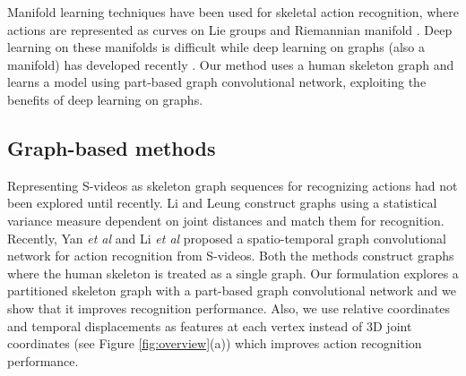 \documentclass{bmvc2k}
\def\etal{\emph{et al}\bmvaOneDot}
\begin{document}
Manifold learning techniques have been used for skeletal action recognition, where actions are represented as curves on Lie groups \cite{vemulapalli2014human} and Riemannian manifold \cite{devanne20153}. Deep learning on these manifolds is difficult \cite{huang2017deep} while deep learning on graphs (also a manifold) has developed recently \cite{defferrard2016convolutional, kipf2016semi}. Our method uses a human skeleton graph and learns a model using part-based graph convolutional network, exploiting the benefits of deep learning on graphs.

\subsection{Graph-based methods}
\label{sec:2_2}
Representing S-videos as skeleton graph sequences for recognizing actions had not been explored until recently. Li and Leung \cite{li2017graph} construct graphs using a statistical variance measure dependent on joint distances and match them for recognition. Recently, Yan \etal \cite{yan2018spatial} and Li \etal \cite{li2018spatio} proposed a spatio-temporal graph convolutional network for action recognition from S-videos. Both the methods construct graphs where the human skeleton is treated as a single graph. Our formulation explores a partitioned skeleton graph with a part-based graph convolutional network and we show that it improves recognition performance. Also, we use relative coordinates and temporal displacements as features at each vertex instead of 3D joint coordinates (see Figure \ref{fig:overview}(a)) which improves action recognition performance.
\end{document}
